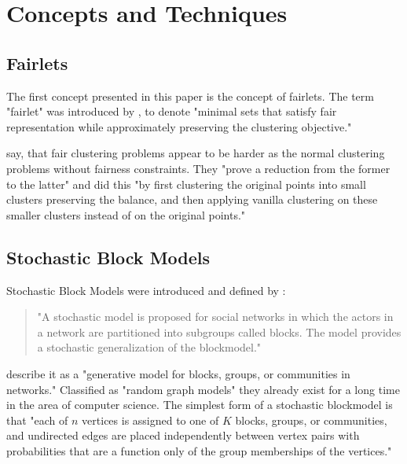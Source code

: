 \section{Concepts and Techniques}


\subsection{Fairlets}
\label{fairlets}

The first concept presented in this paper is the concept of fairlets. The term "fairlet" was introduced by  \textcite[]{Chierichetti2018}, to denote "minimal sets that satisfy fair representation
while approximately preserving the clustering objective." \autocite[1]{Chierichetti2018} 

\textcite[]{Chierichetti2018} say, that fair clustering problems appear to be harder as the normal clustering problems without fairness constraints. They "prove a reduction from the former to the latter" and did this "by first clustering the original points into small clusters preserving the balance, and then applying vanilla clustering on these smaller clusters instead of on the original points." \autocite[5]{Chierichetti2018}


\subsection{Stochastic Block Models}

Stochastic Block Models were introduced and defined by \textcite[]{Holland1983}:

\begin{quote}
"A stochastic model is proposed for social networks in which the actors in a network are partitioned into subgroups called blocks. The model provides a stochastic generalization of the blockmodel."

\autocite[1]{Holland1983}
\end{quote}

\textcite[1]{Karrer2010StochasticNetworks} describe it as a "generative model for blocks, groups, or communities in networks." Classified as "random graph models" they already exist for a long time in the area of computer science.
The simplest form of a stochastic blockmodel is that "each of $n$ vertices is assigned to one of $K$ blocks, groups, or communities, and undirected edges are placed independently between vertex pairs with probabilities that are a function only of the group memberships of the vertices." \autocite[1]{Karrer2010StochasticNetworks}

